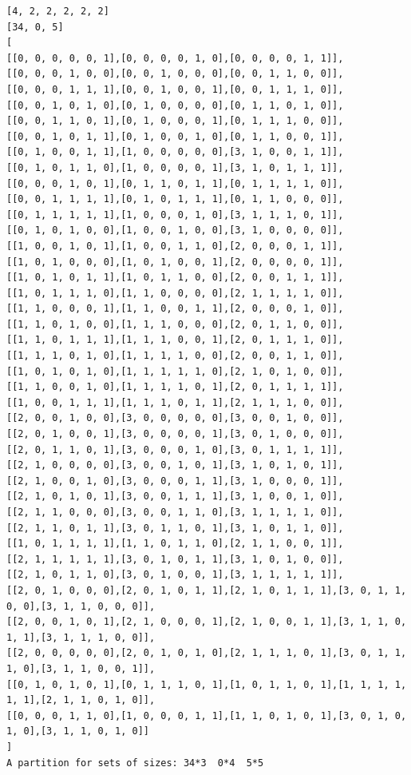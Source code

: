\documentclass[final]{dmtcs-episciences}
\begin{document}
\begin{appendices}
\begin{verbatim} 
[4, 2, 2, 2, 2, 2]
[34, 0, 5]
[
[[0, 0, 0, 0, 0, 1],[0, 0, 0, 0, 1, 0],[0, 0, 0, 0, 1, 1]],
[[0, 0, 0, 1, 0, 0],[0, 0, 1, 0, 0, 0],[0, 0, 1, 1, 0, 0]],
[[0, 0, 0, 1, 1, 1],[0, 0, 1, 0, 0, 1],[0, 0, 1, 1, 1, 0]],
[[0, 0, 1, 0, 1, 0],[0, 1, 0, 0, 0, 0],[0, 1, 1, 0, 1, 0]],
[[0, 0, 1, 1, 0, 1],[0, 1, 0, 0, 0, 1],[0, 1, 1, 1, 0, 0]],
[[0, 0, 1, 0, 1, 1],[0, 1, 0, 0, 1, 0],[0, 1, 1, 0, 0, 1]],
[[0, 1, 0, 0, 1, 1],[1, 0, 0, 0, 0, 0],[3, 1, 0, 0, 1, 1]],
[[0, 1, 0, 1, 1, 0],[1, 0, 0, 0, 0, 1],[3, 1, 0, 1, 1, 1]],
[[0, 0, 0, 1, 0, 1],[0, 1, 1, 0, 1, 1],[0, 1, 1, 1, 1, 0]],
[[0, 0, 1, 1, 1, 1],[0, 1, 0, 1, 1, 1],[0, 1, 1, 0, 0, 0]],
[[0, 1, 1, 1, 1, 1],[1, 0, 0, 0, 1, 0],[3, 1, 1, 1, 0, 1]],
[[0, 1, 0, 1, 0, 0],[1, 0, 0, 1, 0, 0],[3, 1, 0, 0, 0, 0]],
[[1, 0, 0, 1, 0, 1],[1, 0, 0, 1, 1, 0],[2, 0, 0, 0, 1, 1]],
[[1, 0, 1, 0, 0, 0],[1, 0, 1, 0, 0, 1],[2, 0, 0, 0, 0, 1]],
[[1, 0, 1, 0, 1, 1],[1, 0, 1, 1, 0, 0],[2, 0, 0, 1, 1, 1]],
[[1, 0, 1, 1, 1, 0],[1, 1, 0, 0, 0, 0],[2, 1, 1, 1, 1, 0]],
[[1, 1, 0, 0, 0, 1],[1, 1, 0, 0, 1, 1],[2, 0, 0, 0, 1, 0]],
[[1, 1, 0, 1, 0, 0],[1, 1, 1, 0, 0, 0],[2, 0, 1, 1, 0, 0]],
[[1, 1, 0, 1, 1, 1],[1, 1, 1, 0, 0, 1],[2, 0, 1, 1, 1, 0]],
[[1, 1, 1, 0, 1, 0],[1, 1, 1, 1, 0, 0],[2, 0, 0, 1, 1, 0]],
[[1, 0, 1, 0, 1, 0],[1, 1, 1, 1, 1, 0],[2, 1, 0, 1, 0, 0]],
[[1, 1, 0, 0, 1, 0],[1, 1, 1, 1, 0, 1],[2, 0, 1, 1, 1, 1]],
[[1, 0, 0, 1, 1, 1],[1, 1, 1, 0, 1, 1],[2, 1, 1, 1, 0, 0]],
[[2, 0, 0, 1, 0, 0],[3, 0, 0, 0, 0, 0],[3, 0, 0, 1, 0, 0]],
[[2, 0, 1, 0, 0, 1],[3, 0, 0, 0, 0, 1],[3, 0, 1, 0, 0, 0]],
[[2, 0, 1, 1, 0, 1],[3, 0, 0, 0, 1, 0],[3, 0, 1, 1, 1, 1]],
[[2, 1, 0, 0, 0, 0],[3, 0, 0, 1, 0, 1],[3, 1, 0, 1, 0, 1]],
[[2, 1, 0, 0, 1, 0],[3, 0, 0, 0, 1, 1],[3, 1, 0, 0, 0, 1]],
[[2, 1, 0, 1, 0, 1],[3, 0, 0, 1, 1, 1],[3, 1, 0, 0, 1, 0]],
[[2, 1, 1, 0, 0, 0],[3, 0, 0, 1, 1, 0],[3, 1, 1, 1, 1, 0]],
[[2, 1, 1, 0, 1, 1],[3, 0, 1, 1, 0, 1],[3, 1, 0, 1, 1, 0]],
[[1, 0, 1, 1, 1, 1],[1, 1, 0, 1, 1, 0],[2, 1, 1, 0, 0, 1]],
[[2, 1, 1, 1, 1, 1],[3, 0, 1, 0, 1, 1],[3, 1, 0, 1, 0, 0]],
[[2, 1, 0, 1, 1, 0],[3, 0, 1, 0, 0, 1],[3, 1, 1, 1, 1, 1]],
[[2, 0, 1, 0, 0, 0],[2, 0, 1, 0, 1, 1],[2, 1, 0, 1, 1, 1],[3, 0, 1, 1, 0, 0],[3, 1, 1, 0, 0, 0]],
[[2, 0, 0, 1, 0, 1],[2, 1, 0, 0, 0, 1],[2, 1, 0, 0, 1, 1],[3, 1, 1, 0, 1, 1],[3, 1, 1, 1, 0, 0]],
[[2, 0, 0, 0, 0, 0],[2, 0, 1, 0, 1, 0],[2, 1, 1, 1, 0, 1],[3, 0, 1, 1, 1, 0],[3, 1, 1, 0, 0, 1]],
[[0, 1, 0, 1, 0, 1],[0, 1, 1, 1, 0, 1],[1, 0, 1, 1, 0, 1],[1, 1, 1, 1, 1, 1],[2, 1, 1, 0, 1, 0]],
[[0, 0, 0, 1, 1, 0],[1, 0, 0, 0, 1, 1],[1, 1, 0, 1, 0, 1],[3, 0, 1, 0, 1, 0],[3, 1, 1, 0, 1, 0]]
]
A partition for sets of sizes: 34*3  0*4  5*5
\end{verbatim}
\newpage


\end{appendices}
\end{document}
